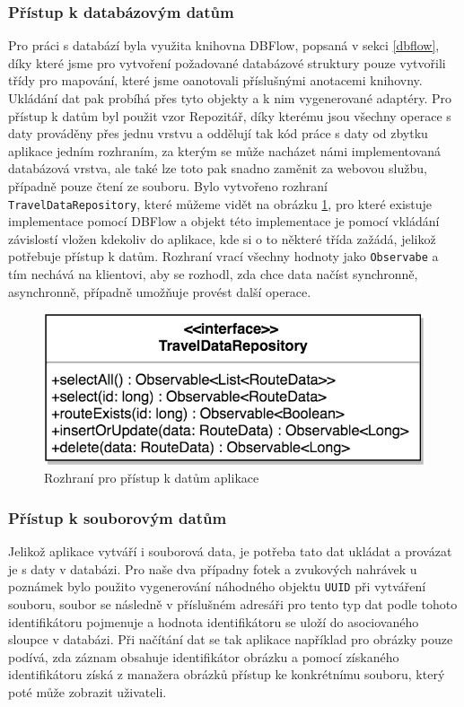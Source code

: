 \documentclass{article}
\begin{document}
\subsubsection{Přístup k databázovým datům}
Pro práci s databází byla využita knihovna DBFlow, popsaná v sekci \ref{dbflow}, díky které jsme pro vytvoření
požadované databázové struktury pouze vytvořili třídy pro mapování, které jsme oanotovali příslušnými
anotacemi knihovny. Ukládání dat pak probíhá přes tyto objekty a k nim vygenerované adaptéry.
Pro přístup k datům byl použit vzor Repozitář\cite{repository}, díky kterému
jsou všechny operace s daty prováděny přes jednu vrstvu a oddělují tak kód práce s daty od zbytku aplikace
jedním rozhraním, za kterým se může nacházet námi implementovaná databázová vrstva, ale také lze toto
pak snadno zaměnit za webovou službu, případně pouze čtení ze souboru.
Bylo vytvořeno rozhraní \texttt{TravelDataRepository}, které můžeme vidět na obrázku \ref{fig:traveldatarepo},
pro které existuje implementace pomocí DBFlow a objekt této implementace je pomocí vkládání závislostí vložen
kdekoliv do aplikace, kde si o to některé třída zažádá, jelikož potřebuje přístup k datům.
Rozhraní vrací všechny hodnoty jako \texttt{Observabe} a tím nechává na klientovi, aby se rozhodl, zda
chce data načíst synchronně, asynchronně, případně umožňuje provést další operace.

\begin{figure}[H]
        \centering
                \includegraphics[scale=0.2]{img/repo.png}
        \caption{Rozhraní pro přístup k datům aplikace}
        \label{fig:traveldatarepo}
\end{figure}

\subsubsection{Přístup k souborovým datům}
Jelikož aplikace vytváří i souborová data, je potřeba tato dat ukládat a provázat je s daty v databázi.
Pro naše dva případny fotek a zvukových nahrávek u poznámek bylo použito vygenerování náhodného
objektu \texttt{UUID} při vytváření souboru, soubor se následně v příslušném adresáři pro tento typ
dat podle tohoto identifikátoru pojmenuje a hodnota identifikátoru se uloží do asociovaného sloupce
v databázi. Při načítání dat se tak aplikace například pro obrázky pouze podívá, zda záznam obsahuje
identifikátor obrázku a pomocí získaného identifikátoru získá z manažera obrázků přístup ke konkrétnímu
souboru, který poté může zobrazit uživateli.
\end{document}
